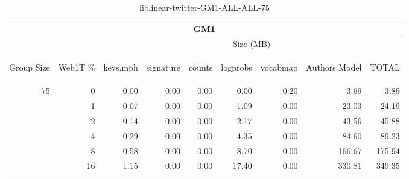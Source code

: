 \begin{center}
\begin{table}[htbp] 
 \begin{center}
\begin{tabular}{ | r | r | r | r | r | r | r | r | r |}
\hline
\multicolumn{9}{|c|}{GM1}\\
\hline
 & & \multicolumn{7}{|c|}{Size (MB)}\\ \cline{3-9}
\begin{sideways}Group Size\end{sideways} & \begin{sideways}Web1T \% \end{sideways} & \begin{sideways}keys.mph\end{sideways} & \begin{sideways}signature\end{sideways} & \begin{sideways}counts\end{sideways} & \begin{sideways}logprobs\end{sideways} & \begin{sideways}vocabmap\end{sideways} & \begin{sideways}Authors Model \end{sideways} & \begin{sideways}TOTAL\end{sideways}\\
\hline
\multirow{5}{*}{75}
 & 0 & 0.00 & 0.00 & 0.00 & 0.00 & 0.20 & 3.69 & 3.89\\ \cline{2-9}
 & 1 & 0.07 & 0.00 & 0.00 & 1.09 & 0.00 & 23.03 & 24.19\\ \cline{2-9}
 & 2 & 0.14 & 0.00 & 0.00 & 2.17 & 0.00 & 43.56 & 45.88\\ \cline{2-9}
 & 4 & 0.29 & 0.00 & 0.00 & 4.35 & 0.00 & 84.60 & 89.23\\ \cline{2-9}
 & 8 & 0.58 & 0.00 & 0.00 & 8.70 & 0.00 & 166.67 & 175.94\\ \cline{2-9}
 & 16 & 1.15 & 0.00 & 0.00 & 17.40 & 0.00 & 330.81 & 349.35\\ \cline{2-9}
\hline
\end{tabular}
\caption{liblinear-twitter-GM1-ALL-ALL-75}
\label{table:liblinear-twitter-GM1-ALL-ALL-75}
\end{center}
 \end{table}
\end{center}

